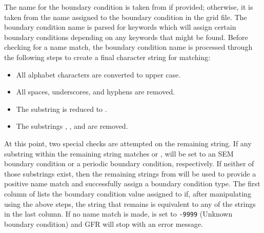 The name for the boundary condition is taken from  if provided;
otherwise, it is taken from the name assigned to the boundary condition in the
grid file.
%
The boundary condition name is parsed for keywords which will assign
certain boundary conditions depending on any keywords that might be found.
%
Before checking for a name match, the boundary condition name is processed
through the following steps to create a final character string for matching:
%
\begin{itemize}
  \item All alphabet characters are converted to upper case.
  \item All spaces, underscores, and hyphens are removed.
  \item The substring  is reduced to .
  \item The substrings , , and  are
    removed.
\end{itemize}
%
At this point, two special checks are attempted on the remaining string.
%
If any substring within the remaining string matches  or
,  will be set to an SEM boundary
condition or a periodic boundary condition, respectively.
%
If neither of those substrings exist, then the remaining strings from
 will be used to provide a positive name match and
successfully assign a boundary condition type.
%
The first column of  lists the boundary condition value
assigned to  if, after manipulating 
using the above steps, the string that remains is equivalent to any of the
strings in the last column.
%
If no name match is made,  is set to \texttt{-9999}
(Unknown boundary condition) and GFR will stop with an error message.


